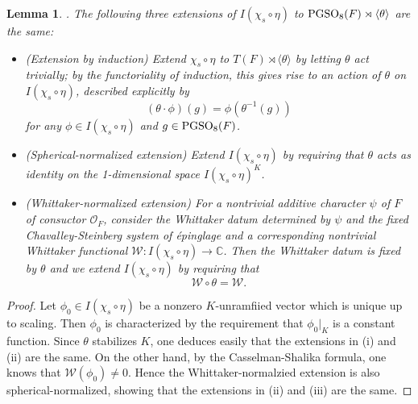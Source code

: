 \documentclass[11pt]{amsart}
\theoremstyle{plain}
\newtheorem{lemma}[equation]{Lemma}
\numberwithin{equation}{section}
\newcommand{\C}{\mathbb C}
\def\PGSO{{\rm PGSO}}
\def\C{{\bf C}}
\def\C{{\mathbb C}}
\begin{document}
     \begin{lemma}. \label{L:extension}
     The following three extensions of $I(\chi_s \circ \eta)$ to $\PGSO_8(F) \rtimes \langle \theta \rangle$ are the same:
    \vskip 5pt
    \begin{itemize}
    \item[(i)] (Extension by induction)  Extend $\chi_s \circ \eta$ to $T(F) \rtimes \langle \theta \rangle$ by letting $\theta$ act trivially;  by the functoriality of induction, this gives rise to an action of $\theta$ on $I(\chi_s \circ \eta)$, described explicitly  by
   \[  (\theta \cdot \phi) (g) = \phi( \theta^{-1}(g)) \]
    for  any $\phi \in I(\chi_s \circ \eta)$ and $g \in \PGSO_8(F)$. 
    \vskip 5pt
    
    
    \item[(ii)]  (Spherical-normalized extension) Extend $I(\chi_s \circ \eta)$ by requiring that $\theta$ acts as identity on  the 1-dimensional space $I(\chi_s \circ \eta)^K$.
    \vskip 5pt
    
    \item[(iii)]  (Whittaker-normalized extension)  For a nontrivial additive character $\psi$ of $F$ of consuctor $\mathcal{O}_F$, consider the Whittaker datum determined by $\psi$ and the fixed Chavalley-Steinberg system of \'epinglage and a corresponding nontrivial Whittaker functional  $\mathcal{W}: I(\chi_s \circ \eta) \longrightarrow \C$. Then the Whittaker datum is fixed by $\theta$ and we  extend $I(\chi_s \circ \eta)$ by requiring that
  \[  \mathcal{W} \circ \theta = \mathcal{W}. \]
      \end{itemize}
      \end{lemma}
   \vskip 5pt
   
   \begin{proof}
   Let $\phi_0 \in I(\chi_s \circ \eta)$ be a  nonzero $K$-unramfiied vector which is unique up to scaling. Then $\phi_0$ is characterized by the requirement that $\phi_0|_K$ is a constant function. Since $\theta$ stabilizes $K$, one deduces easily that the extensions in (i) and (ii) are the same. On the other hand, by the Casselman-Shalika formula, one knows that $\mathcal{W}(\phi_0) \ne 0$. Hence the Whittaker-normalzied extension is also spherical-normalized, showing that the extensions in (ii) and (iii) are the same. 
      \end{proof}
   \vskip 5pt
\end{document}
